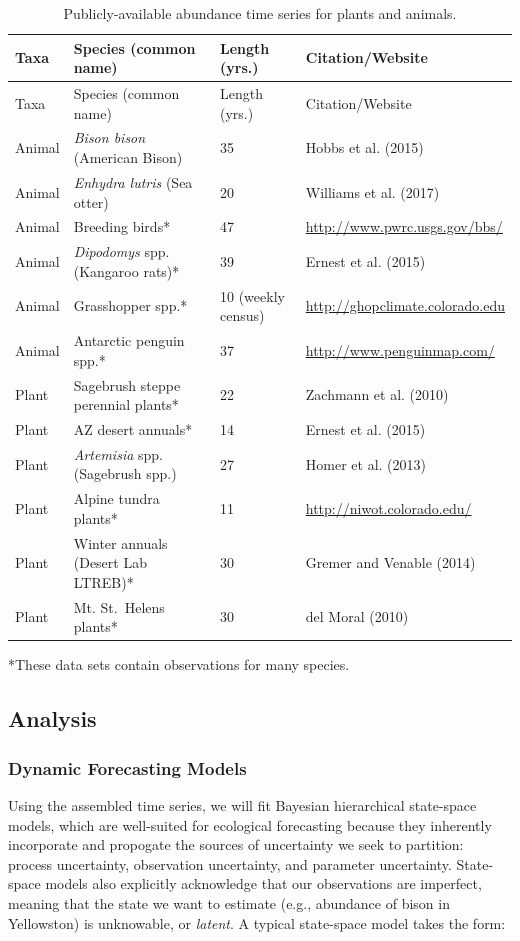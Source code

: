 \documentclass[12pt,]{article}
\begin{document}
\footnotesize

\begin{longtable}[]{@{}llll@{}}
\caption{Publicly-available abundance time series for plants and
animals.}\tabularnewline
\toprule
Taxa & Species (common name) & Length (yrs.) &
Citation/Website\tabularnewline
\midrule
\endfirsthead
\toprule
Taxa & Species (common name) & Length (yrs.) &
Citation/Website\tabularnewline
\midrule
\endhead
Animal & \emph{Bison bison} (American Bison) & 35 & Hobbs et al.
(2015)\tabularnewline
Animal & \emph{Enhydra lutris} (Sea otter) & 20 & Williams et al.
(2017)\tabularnewline
Animal & Breeding birds* & 47 &
\url{http://www.pwrc.usgs.gov/bbs/}\tabularnewline
Animal & \emph{Dipodomys} spp. (Kangaroo rats)* & 39 & Ernest et al.
(2015)\tabularnewline
Animal & Grasshopper spp.* & 10 (weekly census) &
\url{http://ghopclimate.colorado.edu}\tabularnewline
Animal & Antarctic penguin spp.* & 37 &
\url{http://www.penguinmap.com/}\tabularnewline
Plant & Sagebrush steppe perennial plants* & 22 & Zachmann et al.
(2010)\tabularnewline
Plant & AZ desert annuals* & 14 & Ernest et al. (2015)\tabularnewline
Plant & \emph{Artemisia} spp. (Sagebrush spp.) & 27 & Homer et al.
(2013)\tabularnewline
Plant & Alpine tundra plants* & 11 &
\url{http://niwot.colorado.edu/}\tabularnewline
Plant & Winter annuals (Desert Lab LTREB)* & 30 & Gremer and Venable
(2014)\tabularnewline
Plant & Mt. St.~Helens plants* & 30 & del Moral (2010)\tabularnewline
\bottomrule
\end{longtable}

\vspace{-2em} *These data sets contain observations for many species.

\normalsize

\subsection{Analysis}\subsubsection{Dynamic Forecasting Models}

Using the assembled time series, we will fit Bayesian hierarchical
state-space models, which are well-suited for ecological forecasting
because they inherently incorporate and propogate the sources of
uncertainty we seek to partition: process uncertainty, observation
uncertainty, and parameter uncertainty. State-space models also
explicitly acknowledge that our observations are imperfect, meaning that
the state we want to estimate (e.g., abundance of bison in Yellowston)
is unknowable, or \emph{latent}. A typical state-space model takes the
form: \vspace{-2em}
\end{document}
